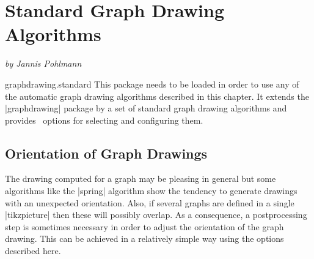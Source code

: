 %
%
%

\section{Standard Graph Drawing Algorithms}
\label{section-library-graphdrawing-standard}

{\emph{by Jannis Pohlmann}}

\begin{tikzlibrary}{graphdrawing.standard}
  This package needs to be loaded in order to use any of the automatic
  graph drawing algorithms described in this chapter. It extends the
  |graphdrawing| package by a set of standard graph drawing 
  algorithms and provides \tikzname\ options for selecting and 
  configuring them.
\end{tikzlibrary}

\subsection{Orientation of Graph Drawings}

The drawing computed for a graph may be pleasing in general but some
algorithms like the |spring| algorithm show the tendency to generate
drawings with an unexpected orientation. Also, if several graphs are 
defined in a single |{tikzpicture}| then these will possibly overlap.
As a consequence, a postprocessing step is sometimes necessary in order
to adjust the orientation of the graph drawing. This can be achieved in
a relatively simple way using the options described here.

